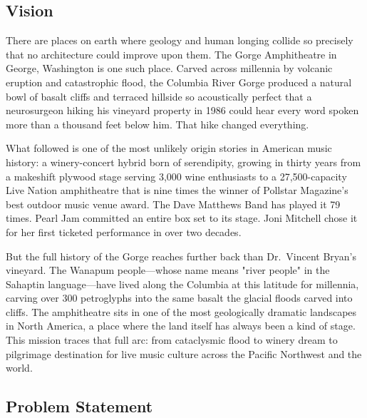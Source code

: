 \documentclass[11pt,letterpaper]{article}
\begin{document}
\subsection{Vision}

There are places on earth where geology and human longing collide so precisely that no architecture could improve upon them. The Gorge Amphitheatre in George, Washington is one such place. Carved across millennia by volcanic eruption and catastrophic flood, the Columbia River Gorge produced a natural bowl of basalt cliffs and terraced hillside so acoustically perfect that a neurosurgeon hiking his vineyard property in 1986 could hear every word spoken more than a thousand feet below him. That hike changed everything.

What followed is one of the most unlikely origin stories in American music history: a winery-concert hybrid born of serendipity, growing in thirty years from a makeshift plywood stage serving 3,000 wine enthusiasts to a 27,500-capacity Live Nation amphitheatre that is nine times the winner of Pollstar Magazine's best outdoor music venue award. The Dave Matthews Band has played it 79 times. Pearl Jam committed an entire box set to its stage. Joni Mitchell chose it for her first ticketed performance in over two decades.

But the full history of the Gorge reaches further back than Dr.\ Vincent Bryan's vineyard. The Wanapum people---whose name means "river people" in the Sahaptin language---have lived along the Columbia at this latitude for millennia, carving over 300 petroglyphs into the same basalt the glacial floods carved into cliffs. The amphitheatre sits in one of the most geologically dramatic landscapes in North America, a place where the land itself has always been a kind of stage. This mission traces that full arc: from cataclysmic flood to winery dream to pilgrimage destination for live music culture across the Pacific Northwest and the world.

\subsection{Problem Statement}
\end{document}

